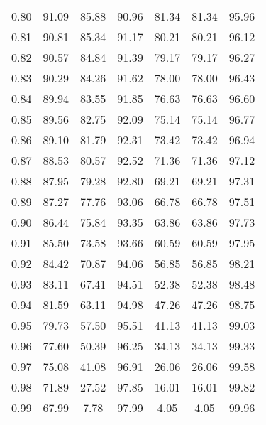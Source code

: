 \begin{tabular}{|c|c|c|c|c|c|c|}
      0.80 &     91.09 &     85.88 &      90.96 &   81.34 &      81.34 &         95.96 \\
      0.81 &     90.81 &     85.34 &      91.17 &   80.21 &      80.21 &         96.12 \\
      0.82 &     90.57 &     84.84 &      91.39 &   79.17 &      79.17 &         96.27 \\
      0.83 &     90.29 &     84.26 &      91.62 &   78.00 &      78.00 &         96.43 \\
      0.84 &     89.94 &     83.55 &      91.85 &   76.63 &      76.63 &         96.60 \\
      0.85 &     89.56 &     82.75 &      92.09 &   75.14 &      75.14 &         96.77 \\
      0.86 &     89.10 &     81.79 &      92.31 &   73.42 &      73.42 &         96.94 \\
      0.87 &     88.53 &     80.57 &      92.52 &   71.36 &      71.36 &         97.12 \\
      0.88 &     87.95 &     79.28 &      92.80 &   69.21 &      69.21 &         97.31 \\
      0.89 &     87.27 &     77.76 &      93.06 &   66.78 &      66.78 &         97.51 \\
      0.90 &     86.44 &     75.84 &      93.35 &   63.86 &      63.86 &         97.73 \\
      0.91 &     85.50 &     73.58 &      93.66 &   60.59 &      60.59 &         97.95 \\
      0.92 &     84.42 &     70.87 &      94.06 &   56.85 &      56.85 &         98.21 \\
      0.93 &     83.11 &     67.41 &      94.51 &   52.38 &      52.38 &         98.48 \\
      0.94 &     81.59 &     63.11 &      94.98 &   47.26 &      47.26 &         98.75 \\
      0.95 &     79.73 &     57.50 &      95.51 &   41.13 &      41.13 &         99.03 \\
      0.96 &     77.60 &     50.39 &      96.25 &   34.13 &      34.13 &         99.33 \\
      0.97 &     75.08 &     41.08 &      96.91 &   26.06 &      26.06 &         99.58 \\
      0.98 &     71.89 &     27.52 &      97.85 &   16.01 &      16.01 &         99.82 \\
      0.99 &     67.99 &      7.78 &      97.99 &    4.05 &       4.05 &         99.96 \\
\bottomrule
\end{tabular}

